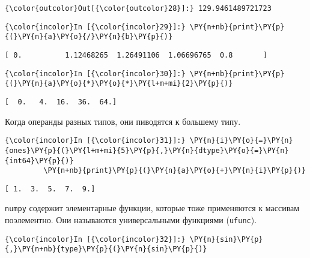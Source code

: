             \begin{Verbatim}[commandchars=\\\{\}]
{\color{outcolor}Out[{\color{outcolor}28}]:} 129.9461489721723
\end{Verbatim}
        
    \begin{Verbatim}[commandchars=\\\{\}]
{\color{incolor}In [{\color{incolor}29}]:} \PY{n+nb}{print}\PY{p}{(}\PY{n}{a}\PY{o}{/}\PY{n}{b}\PY{p}{)}
\end{Verbatim}

    \begin{Verbatim}[commandchars=\\\{\}]
[ 0.          1.12468265  1.26491106  1.06696765  0.8       ]

    \end{Verbatim}

    \begin{Verbatim}[commandchars=\\\{\}]
{\color{incolor}In [{\color{incolor}30}]:} \PY{n+nb}{print}\PY{p}{(}\PY{n}{a}\PY{o}{*}\PY{o}{*}\PY{l+m+mi}{2}\PY{p}{)}
\end{Verbatim}

    \begin{Verbatim}[commandchars=\\\{\}]
[  0.   4.  16.  36.  64.]

    \end{Verbatim}

    Когда операнды разных типов, они пиводятся к большему типу.

    \begin{Verbatim}[commandchars=\\\{\}]
{\color{incolor}In [{\color{incolor}31}]:} \PY{n}{i}\PY{o}{=}\PY{n}{ones}\PY{p}{(}\PY{l+m+mi}{5}\PY{p}{,}\PY{n}{dtype}\PY{o}{=}\PY{n}{int64}\PY{p}{)}
         \PY{n+nb}{print}\PY{p}{(}\PY{n}{a}\PY{o}{+}\PY{n}{i}\PY{p}{)}
\end{Verbatim}

    \begin{Verbatim}[commandchars=\\\{\}]
[ 1.  3.  5.  7.  9.]

    \end{Verbatim}

    \texttt{numpy} содержит элементарные функции, которые тоже применяются к
массивам поэлементно. Они называются универсальными функциями
(\texttt{ufunc}).

    \begin{Verbatim}[commandchars=\\\{\}]
{\color{incolor}In [{\color{incolor}32}]:} \PY{n}{sin}\PY{p}{,}\PY{n+nb}{type}\PY{p}{(}\PY{n}{sin}\PY{p}{)}
\end{Verbatim}


